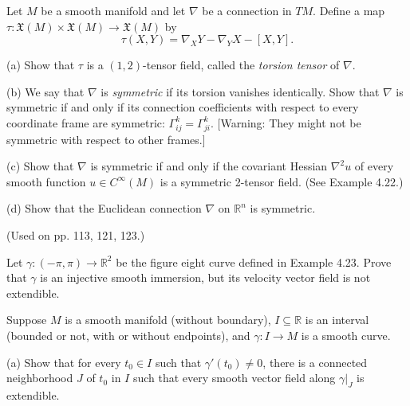 \begin{exercise}\label{prob:torsion-tensor}
Let $M$ be a smooth manifold and let $\nabla$ be a connection in $TM$. Define a map $\tau: \mathfrak{X}(M) \times \mathfrak{X}(M) \to \mathfrak{X}(M)$ by
\[
\tau(X,Y) = \nabla_X Y - \nabla_Y X - [X,Y].
\]

(a) Show that $\tau$ is a $(1,2)$-tensor field, called the \textit{torsion tensor} of $\nabla$.

(b) We say that $\nabla$ is \textit{symmetric} if its torsion vanishes identically. Show that $\nabla$ is symmetric if and only if its connection coefficients with respect to every coordinate frame are symmetric: $\Gamma^k_{ij} = \Gamma^k_{ji}$. [Warning: They might not be symmetric with respect to other frames.]

(c) Show that $\nabla$ is symmetric if and only if the covariant Hessian $\nabla^2 u$ of every smooth function $u \in C^\infty(M)$ is a symmetric 2-tensor field. (See Example 4.22.)

(d) Show that the Euclidean connection $\nabla$ on $\mathbb{R}^n$ is symmetric.

(Used on pp. 113, 121, 123.)
\end{exercise}

\begin{exercise}\label{prob:figure-eight-immersion}
Let $\gamma: (-\pi, \pi) \to \mathbb{R}^2$ be the figure eight curve defined in Example 4.23. Prove that $\gamma$ is an injective smooth immersion, but its velocity vector field is not extendible.
\end{exercise}

\begin{exercise}\label{prob:vector-field-extendibility}
Suppose $M$ is a smooth manifold (without boundary), $I \subseteq \mathbb{R}$ is an interval (bounded or not, with or without endpoints), and $\gamma: I \to M$ is a smooth curve.

(a) Show that for every $t_0 \in I$ such that $\gamma'(t_0) \neq 0$, there is a connected neighborhood $J$ of $t_0$ in $I$ such that every smooth vector field along $\gamma|_J$ is extendible.
\end{exercise}

